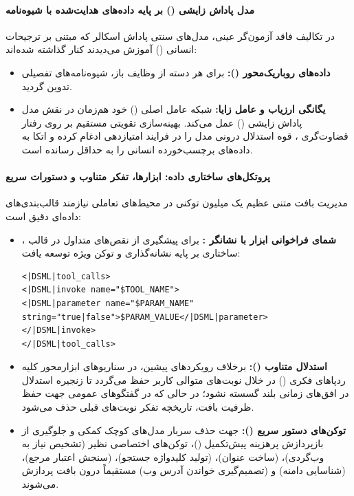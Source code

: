 \paragraph*{مدل پاداش زایشی () بر پایه داده‌های هدایت‌شده با شیوه‌نامه}
در تکالیف فاقد آزمون‌گر عینی، مدل‌های سنتی پاداش اسکالر که مبتنی بر ترجیحات انسانی () آموزش می‌دیدند کنار گذاشته شده‌اند:
\begin{itemize}
    \item \textbf{داده‌های روباریک‌محور ():} برای هر دسته از وظایف باز، شیوه‌نامه‌های تفصیلی تدوین گردید.
    \item \textbf{یگانگی ارزیاب و عامل زایا:} شبکه عامل اصلی () خود هم‌زمان در نقش مدل پاداش زایشی () عمل می‌کند. بهینه‌سازی تقویتی مستقیم بر روی رفتار قضاوت‌گری ، قوه استدلال درونی مدل را در فرایند امتیازدهی ادغام کرده و اتکا به داده‌های برچسب‌خورده انسانی را به حداقل رسانده است.
\end{itemize}

\paragraph*{پروتکل‌های ساختاری داده: ابزارها، تفکر متناوب و دستورات سریع}
مدیریت بافت متنی عظیم یک میلیون توکنی در محیط‌های تعاملی نیازمند قالب‌بندی‌های داده‌ای دقیق است:
\begin{itemize}
    \item \textbf{شمای فراخوانی ابزار با نشانگر :} برای پیشگیری از نقص‌های متداول در قالب ، ساختاری بر پایه نشانه‌گذاری  و توکن ویژه  توسعه یافت:
\begin{latin}
\begin{small}
\begin{verbatim}
<|DSML|tool_calls>
<|DSML|invoke name="$TOOL_NAME">
<|DSML|parameter name="$PARAM_NAME" string="true|false">$PARAM_VALUE</|DSML|parameter>
</|DSML|invoke>
</|DSML|tool_calls>
\end{verbatim}
\end{small}
\end{latin}
    \item \textbf{استدلال متناوب ():} برخلاف رویکردهای پیشین، در سناریوهای ابزارمحور کلیه ردپاهای فکری () در خلال نوبت‌های متوالی کاربر حفظ می‌گردد تا زنجیره استدلال در افق‌های زمانی بلند گسسته نشود؛ در حالی که در گفتگوهای عمومی جهت حفظ ظرفیت بافت، تاریخچه تفکر نوبت‌های قبلی حذف می‌شود.
    \item \textbf{توکن‌های دستور سریع ():} جهت حذف سربار مدل‌های کوچک کمکی و جلوگیری از بازپردازش پرهزینه پیش‌تکمیل ()، توکن‌های اختصاصی نظیر  (تشخیص نیاز به وب‌گردی)،  (ساخت عنوان)،  (تولید کلیدواژه جستجو)،  (سنجش اعتبار مرجع)،  (شناسایی دامنه) و  (تصمیم‌گیری خواندن آدرس وب) مستقیماً درون بافت پردازش می‌شوند.
\end{itemize}

